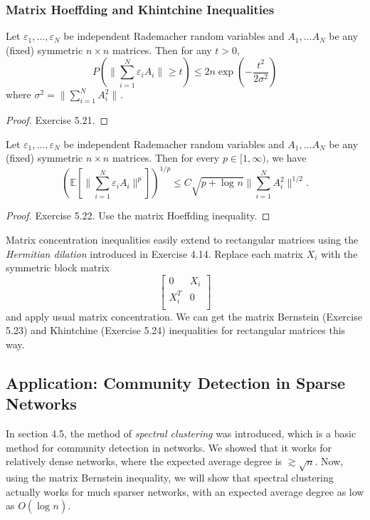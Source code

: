 \subsubsection{Matrix Hoeffding and Khintchine Inequalities}
\begin{theorem}
\label{thm:5.4.13}
Let $\varepsilon_1, \dots, \varepsilon_N$ be independent Rademacher random variables and $A_1, \dots A_N$ be 
any (fixed) symmetric $n \times n$ matrices. Then for any $t > 0$, 
\[ P \left( \lVert \sum_{i = 1}^{N} \varepsilon_i A_i \rVert_{} \geq t \right) 
\leq 2n \exp{\left( -\frac{t^2}{2 \sigma^2} \right)} \]
where $\sigma^2 = \lVert \sum_{i = 1}^{N} A_i^2 \rVert_{}$.
\end{theorem}

\begin{proof}
Exercise 5.21.
\end{proof}

\begin{theorem}
\label{thm:5.4.14}
Let $\varepsilon_1, \dots, \varepsilon_N$ be independent Rademacher random variables and $A_1, \dots A_N$ be 
any (fixed) symmetric $n \times n$ matrices. Then for every $p \in [1, \infty)$, we have 
\[ \left( \mathbb{E}\left[ \lVert \sum_{i = 1}^{N} \varepsilon_i A_i \rVert_{}^p \right] \right)^{1/p} 
\leq C \sqrt{p + \log_{}{n}} \lVert \sum_{i = 1}^{N} A_i^2 \rVert_{}^{1/2}. \]
\end{theorem}

\begin{proof}
Exercise 5.22. Use the matrix Hoeffding inequality.
\end{proof}

\begin{remark}
\label{rmk:5.4.15}
Matrix concentration inequalities easily extend to rectangular matrices using the \textit{Hermitian dilation} 
introduced in Exercise 4.14. Replace each matrix $X_i$ with the symmetric block matrix 
\[ \begin{bmatrix}
0 & X_i \\
X_i^T & 0 \\
\end{bmatrix} \]
and apply usual matrix concentration. We can get the matrix Bernstein (Exercise 5.23) and Khintchine (Exercise 
5.24) inequalities for rectangular matrices this way.
\end{remark}



\subsection{Application: Community Detection in Sparse Networks}
In section 4.5, the method of \textit{spectral clustering} was introduced, which is a basic method for 
community detection in networks. We showed that it works for relatively dense networks, where the expected 
average degree is $\gtrsim \sqrt{n}$. Now, using the matrix Bernstein inequality, we will show that spectral 
clustering actually works for much sparser networks, with an expected average degree as low as $O(\log_{}{n})$.

